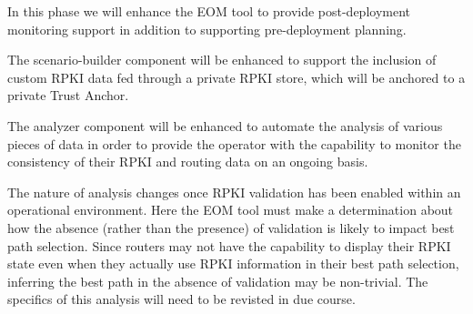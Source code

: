 In this phase we will enhance the EOM tool to provide post-deployment
monitoring support in addition to supporting pre-deployment planning. 

The scenario-builder component will be enhanced to support the inclusion
of custom RPKI data fed through a private RPKI store, which will be
anchored to a private Trust Anchor. 

The analyzer component will be enhanced to automate the analysis of
various pieces of data in order to provide the operator with the
capability to monitor the consistency of their RPKI and routing data on
an ongoing basis. 

The nature of analysis changes once RPKI validation has been enabled
within an operational environment. Here the EOM tool must make a
determination about how the absence (rather than the presence) of
validation is likely to impact best path selection.
Since routers may not have the capability to display their RPKI
state even when they actually use RPKI information in their best path
selection, inferring the best path in the absence of validation may
be non-trivial. The specifics of this analysis will need to be
revisted in due course. 

